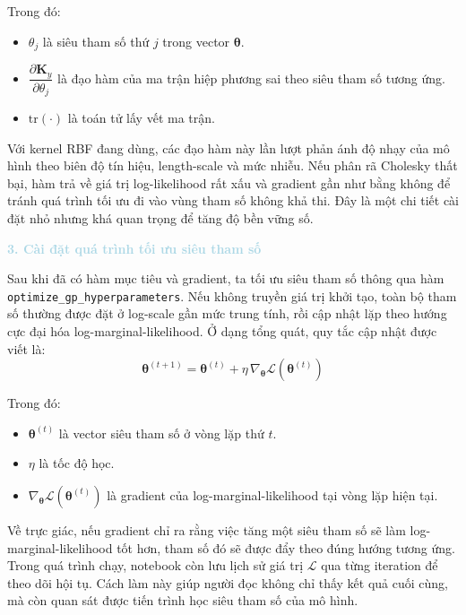 Trong đó:
\begin{itemize}
    \item $\theta_j$ là siêu tham số thứ $j$ trong vector $\boldsymbol{\theta}$.
    \item $\dfrac{\partial \mathbf{K}_y}{\partial \theta_j}$ là đạo hàm của ma trận hiệp phương sai theo siêu tham số tương ứng.
    \item $\mathrm{tr}(\cdot)$ là toán tử lấy vết ma trận.
\end{itemize}

Với kernel RBF đang dùng, các đạo hàm này lần lượt phản ánh độ nhạy của mô hình theo biên độ tín hiệu, length-scale và mức nhiễu. Nếu phân rã Cholesky thất bại, hàm trả về giá trị log-likelihood rất xấu và gradient gần như bằng không để tránh quá trình tối ưu đi vào vùng tham số không khả thi. Đây là một chi tiết cài đặt nhỏ nhưng khá quan trọng để tăng độ bền vững số.

\noindent\textcolor{lightblue}{\textbf{3. Cài đặt quá trình tối ưu siêu tham số}}

Sau khi đã có hàm mục tiêu và gradient, ta tối ưu siêu tham số thông qua hàm \texttt{optimize\_gp\_hyperparameters}. Nếu không truyền giá trị khởi tạo, toàn bộ tham số thường được đặt ở log-scale gần mức trung tính, rồi cập nhật lặp theo hướng cực đại hóa log-marginal-likelihood. Ở dạng tổng quát, quy tắc cập nhật được viết là:
\begin{equation}
    \boldsymbol{\theta}^{(t+1)} = \boldsymbol{\theta}^{(t)} + \eta\, \nabla_{\boldsymbol{\theta}} \mathcal{L}(\boldsymbol{\theta}^{(t)})
\end{equation}

Trong đó:
\begin{itemize}
    \item $\boldsymbol{\theta}^{(t)}$ là vector siêu tham số ở vòng lặp thứ $t$.
    \item $\eta$ là tốc độ học.
    \item $\nabla_{\boldsymbol{\theta}} \mathcal{L}(\boldsymbol{\theta}^{(t)})$ là gradient của log-marginal-likelihood tại vòng lặp hiện tại.
\end{itemize}

Về trực giác, nếu gradient chỉ ra rằng việc tăng một siêu tham số sẽ làm log-marginal-likelihood tốt hơn, tham số đó sẽ được đẩy theo đúng hướng tương ứng. Trong quá trình chạy, notebook còn lưu lịch sử giá trị $\mathcal{L}$ qua từng iteration để theo dõi hội tụ. Cách làm này giúp người đọc không chỉ thấy kết quả cuối cùng, mà còn quan sát được tiến trình học siêu tham số của mô hình.

